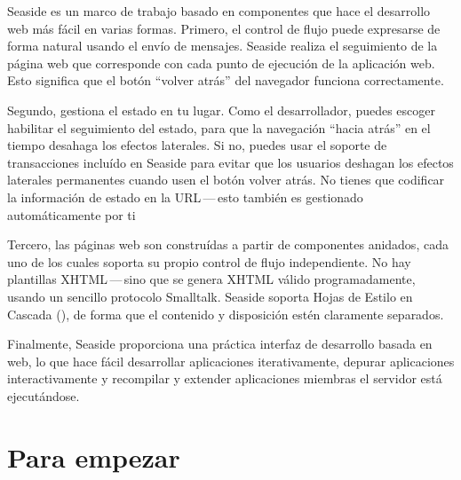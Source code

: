 \documentclass[a4paper,10pt,twoside]{book}
\begin{document}


Seaside es un marco de trabajo basado en componentes que hace el desarrollo web más fácil en varias formas.
Primero, el control de flujo puede expresarse de forma natural usando el envío de mensajes. Seaside realiza el seguimiento de la página web que corresponde con cada punto de ejecución de la aplicación web.
Esto significa que el botón ``volver atrás'' del navegador funciona correctamente.  

Segundo, gestiona el estado en tu lugar.
Como el desarrollador, puedes escoger habilitar el seguimiento del estado, para que la navegación ``hacia atrás'' en el tiempo desahaga los efectos laterales.
Si no, puedes usar el soporte de transacciones incluído en Seaside para evitar que los usuarios deshagan los efectos laterales permanentes cuando usen el botón volver atrás.
No tienes que codificar la información de estado en la URL\,---\,esto también es gestionado automáticamente por ti

Tercero, las páginas web son construídas a partir de componentes anidados, cada uno de los cuales soporta su propio control de flujo independiente.
No hay plantillas XHTML\,---\,sino que se genera XHTML válido programadamente, usando un sencillo protocolo Smalltalk.
Seaside soporta Hojas de Estilo en Cascada (), de forma que el contenido y disposición estén claramente separados.

Finalmente, Seaside proporciona una práctica interfaz de desarrollo basada en web, lo que hace fácil desarrollar aplicaciones iterativamente, depurar aplicaciones interactivamente  y recompilar y extender aplicaciones miembras el servidor está ejecutándose.

\section{Para empezar}
\end{document}

